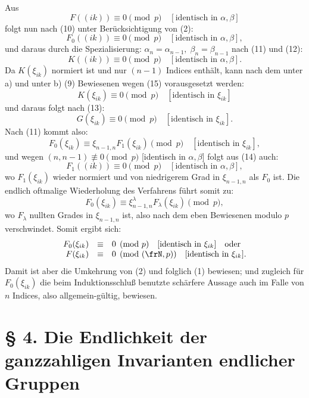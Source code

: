 \documentclass[11pt]{article}
\begin{document}
Aus
\[
        F((ik))\equiv0\pmod p\quad [\text{identisch in \(\alpha,\beta\)}]
\]
folgt nun nach (10) unter Berücksichtigung von (2):
\begin{equation}
        F_0((ik))\equiv0\pmod p\quad [\text{identisch in \(\alpha,\beta\)}],
\end{equation}
und daraus durch die Spezialisierung: \(\alpha_n=\alpha_{n-1},\;\beta_n=\beta_{n-1}\) nach (11) und (12):
\begin{equation}
        K((ik))\equiv0\pmod p\quad [\text{identisch in \(\alpha,\beta\)}].
\end{equation}
Da \(K(\xi_{ik})\) normiert ist und nur \((n-1)\) Indices enthält, kann nach dem unter a) und unter b) (9) Bewiesenen wegen (15) vorausgesetzt werden:
\[
        K(\xi_{ik})\equiv0\pmod p\quad [\text{identisch in \(\xi_{ik}\)}]
\]
und daraus folgt nach (13):
\[
        G(\xi_{ik})\equiv0\pmod p\quad [\text{identisch in \(\xi_{ik}\)}].
\]
Nach (11) kommt also:
\[
        F_0(\xi_{ik})\equiv\xi_{n-1,n}F_1(\xi_{ik})\pmod p\quad [\text{identisch in \(\xi_{ik}\)}],
\]
und wegen \((n,n-1)\not\equiv0\pmod p\) [identisch in \(\alpha,\beta\)] folgt aus (14) auch:
\[
        F_1((ik))\equiv0\pmod p\quad [\text{identisch in \(\alpha,\beta\)}],
\]
wo \(F_1(\xi_{ik})\) wieder normiert und von niedrigerem Grad in \(\xi_{n-1,n}\) als \(F_0\) ist. Die endlich oftmalige Wiederholung des Verfahrens führt somit zu:
\[
        F_0(\xi_{ik})\equiv\xi_{n-1,n}^{\lambda}F_\lambda(\xi_{ik})\pmod p,
\]
wo \(F_\lambda\) nullten Grades in \(\xi_{n-1,n}\) ist, also nach dem eben Bewiesenen modulo \(p\) verschwindet. Somit ergibt sich:
\begin{equation}
\begin{array}{rcl}
        F_0(\xi_{ik})&\equiv&0\pmod p\quad [\text{identisch in \(\xi_{ik}\)}]\quad \text{oder}\\
        F(\xi_{ik})&\equiv&0\pmod{(\frN,p)}\quad [\text{identisch in \(\xi_{ik}\)}].
\end{array}
\end{equation}
Damit ist aber die Umkehrung von (2) und folglich (1) bewiesen; und zugleich für \(F_0(\xi_{ik})\) die beim Induktionsschluß benutzte schärfere Aussage auch im Falle von \(n\) Indices, also allgemein-gültig, bewiesen.

\setcounter{equation}{0}
\section*{§ 4. Die Endlichkeit der ganzzahligen Invarianten endlicher Gruppen}
\end{document}
